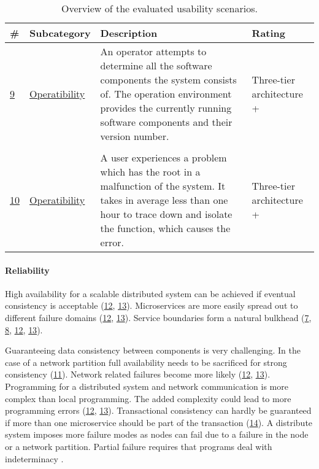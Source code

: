\begin{table}[H]
  \renewcommand{\arraystretch}{1.2}
  \centering
  \sffamily
  \begin{footnotesize}
    \begin{tabular}{l l p{} p{}}
    \toprule
    \textbf{\#} & \textbf{Subcategory} & \textbf{Description}& \textbf{Rating} \\
    \midrule
    \hyperref[quaMicro:s9]{9} & \hyperref[quaMicro:s9]{Operatibility} & An operator attempts to determine all the software components the system consists of. The operation environment provides the currently running software components and their version number. & Three-tier architecture + \\  \\
	\hyperref[quaMicro:s10]{10} & \hyperref[quaMicro:s10]{Operatibility} & A user experiences a problem which has the root in a malfunction of the system. It takes in average less than one hour to trace down and isolate the function, which causes the error. & Three-tier architecture + \\
   \bottomrule
    \end{tabular}
  \end{footnotesize}
  \rmfamily
  \caption[Overview of the evaluated usability scenarios.]{Overview of the evaluated usability scenarios.}
  \label{quaMicro:tableOverview}
\end{table}

\paragraph{Reliability}
\begin{itemize}
\pro High availability for a scalable distributed system can be achieved if eventual consistency is acceptable (\hyperref[quaMicro:s12]{12}, \hyperref[quaMicro:s13]{13}).
\pro Microservices are more easily spread out to different failure domains (\hyperref[quaMicro:s12]{12}, \hyperref[quaMicro:s13]{13}).
\pro Service boundaries form a natural bulkhead (\hyperref[quaMicro:s7]{7}, \hyperref[quaMicro:s8]{8}, \hyperref[quaMicro:s12]{12}, \hyperref[quaMicro:s7]{13}).

\con Guaranteeing data consistency between components is very challenging. In the case of a network partition full availability needs to be sacrificed for strong consistency (\hyperref[quaMicro:s11]{11}).
\con Network related failures become more likely (\hyperref[quaMicro:s12]{12}, \hyperref[quaMicro:s13]{13}).
\con Programming for a distributed system and network communication is more complex than local programming. The added complexity could lead to more programming errors (\hyperref[quaMicro:s12]{12}, \hyperref[quaMicro:s14]{13}).
\con Transactional consistency can hardly be guaranteed if more than one microservice should be part of the transaction (\hyperref[quaMicro:s14]{14}).
\con A distribute system imposes more failure modes as nodes can fail due to a failure in the node or a network partition. Partial failure requires that programs deal with indeterminacy \cite{Kendall1994}.
\end{itemize}


